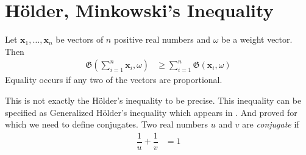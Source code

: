 \documentclass[inequalities.tex]{subfile}
\begin{document}
	\section[Holder and Minkowski]{H\"{o}lder, Minkowski's Inequality}\label{sec:holdmink}

		\begin{theorem}\label{thm:holdergen}
			Let $\mathbf{x}_{1},\ldots,\mathbf{x}_{n}$ be vectors of $n$ positive real numbers and $\omega$ be a weight vector. Then
				\begin{align*}
					\mathfrak{G}\left(\sum_{i=1}^{n}\mathbf{x}_{i},\omega\right)
					& \geq \sum_{i=1}^{n}\mathfrak{G}(\mathbf{x}_{i},\omega)
				\end{align*}
			Equality occurs if any two of the vectors are proportional.
		\end{theorem}
	This is not exactly the H\"{o}lder's inequality to be precise. This inequality can be specified as Generalized H\"{o}lder's inequality which appears in \textcite[Page $117$]{minkowski_1968}. And \textcite{holder_1889} proved  for  which we need to define conjugates. Two real numbers $u$ and $v$ are \textit{conjugate} if
		\begin{align*}
			\dfrac{1}{u}+\dfrac{1}{v}
				& = 1
		\end{align*}
\end{document}
